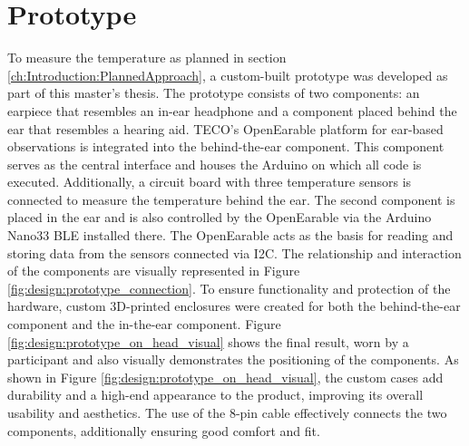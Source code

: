 \section{Prototype}
\label{ch:Design:Prototype}
To measure the temperature as planned in section \ref{ch:Introduction:PlannedApproach}, a custom-built prototype was developed as part of this master's thesis.
The prototype consists of two components: an earpiece that resembles an in-ear headphone and a component placed behind the ear that resembles a hearing aid. TECO's OpenEarable platform for ear-based observations is integrated into the behind-the-ear component. This component serves as the central interface and houses the Arduino on which all code is executed. Additionally, a circuit board with three temperature sensors is connected to measure the temperature behind the ear.
The second component is placed in the ear and is also controlled by the OpenEarable via the Arduino Nano33 BLE installed there. The OpenEarable acts as the basis for reading and storing data from the sensors connected via I2C. The relationship and interaction of the components are visually represented in Figure \ref{fig:design:prototype_connection}.
To ensure functionality and protection of the hardware, custom 3D-printed enclosures were created for both the behind-the-ear component and the in-the-ear component. 
Figure \ref{fig:design:prototype_on_head_visual} shows the final result, worn by a participant and also visually demonstrates the positioning of the components.
As shown in Figure \ref{fig:design:prototype_on_head_visual}, the custom cases add durability and a high-end appearance to the product, improving its overall usability and aesthetics.
The use of the 8-pin cable effectively connects the two components, additionally ensuring good comfort and fit.

